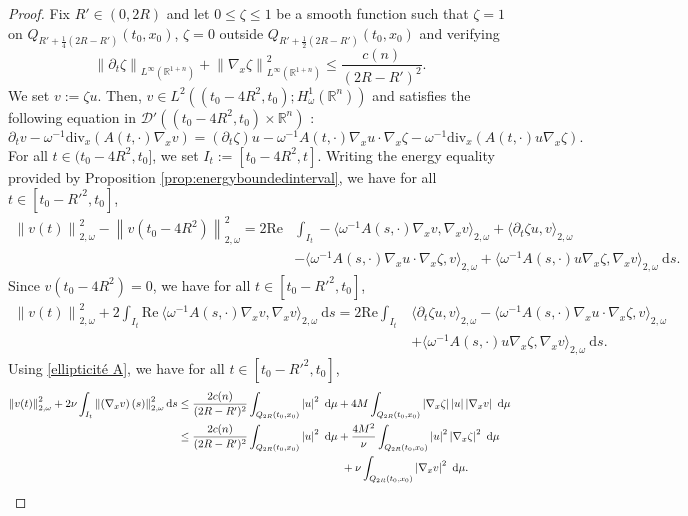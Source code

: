 \documentclass[12pt, letterpaper]{amsart}
\theoremstyle{definition}
\theoremstyle{remark}
\numberwithin{equation}{section}
\begin{document}
\begin{proof}
Fix $R'\in (0,2R)$ and let $0 \leq \zeta \leq 1$ be a smooth function such that $\zeta = 1$ on $Q_{R'+\frac{1}{4}(2R-R')}(t_0,x_0)$, $\zeta = 0$ outside $Q_{R'+\frac{1}{2}(2R-R')}(t_0,x_0)$ and verifying $$\left \| \partial_t \zeta  \right \|_{L^\infty(\mathbb{R}^{1+n})}+\left \| \nabla_x \zeta  \right \|^2_{L^\infty(\mathbb{R}^{1+n})} \leq \frac{c(n)}{(2R-R')^2} .$$ 
We set $v := \zeta u $. Then, $v \in L^2((t_0-4R^2,t_0);H^1_\omega(\mathbb{R}^n))$ and satisfies the following equation in $\mathcal{D}'((t_0-4R^2,t_0)\times \mathbb{R}^n)$ :
\begin{equation*}
    \partial_t v -\omega^{-1}\mathrm{div}_x(A(t,\cdot)\nabla_x v) = (\partial_t\zeta) u - \omega^{-1}A(t,\cdot)\nabla_x u \cdot \nabla_x \zeta - \omega^{-1}\mathrm{div}_x(A(t,\cdot) u \nabla_x \zeta).
\end{equation*}
For all $t \in (t_0-4R^2,t_0]$, we set $I_t:=[t_0-4R^2,t]$. Writing the energy equality provided by Proposition \ref{prop:energyboundedinterval}, we have for all $t \in [t_0-R'^2,t_0]$, 
\begin{align*}
    \left \| v(t) \right \|^2_{2,\omega} - \left \| v(t_0-4R^2) \right \|^2_{2,\omega}= 2 \mathrm{Re} &   \int_{I_t} - \langle \omega^{-1}A(s,\cdot) \nabla_x v, \nabla_x v\rangle_{2,\omega}+\langle \partial_t \zeta u , v\rangle_{2,\omega} \\&- \langle \omega^{-1}A(s,\cdot)\nabla_x u \cdot \nabla_x \zeta, v\rangle_{2,\omega}+\langle \omega^{-1}A(s,\cdot)u \nabla_x \zeta, \nabla_x v\rangle_{2,\omega} \  \mathrm d s.
\end{align*}
Since $v(t_0-4R^2)=0$, we have for all $t \in [t_0-R'^2,t_0]$, 
\begin{align*}
    \left \| v(t) \right \|^2_{2,\omega}+ 2\int_{I_t} \mathrm{Re} \ \langle \omega^{-1}A(s,\cdot) \nabla_x v, \nabla_x v\rangle_{2,\omega} \ \mathrm d s = 2\mathrm{Re}  \int_{I_t}   &\langle \partial_t \zeta u , v\rangle_{2,\omega} - \langle \omega^{-1}A(s,\cdot)\nabla_x u \cdot \nabla_x \zeta, v\rangle_{2,\omega} \\& +  \langle \omega^{-1}A(s,\cdot)u \nabla_x \zeta, \nabla_x v\rangle_{2,\omega} \  \mathrm d s.
\end{align*}
Using \eqref{ellipticité A}, we have for all $t \in [t_0-R'^2,t_0]$,
\begin{align*}
    \left \| v(t) \right \|^2_{2,\omega}+ 2 \nu \int_{I_t} \left \| \left ( \nabla_x v \right )(s) \right \|_{2,\omega}^2 \mathrm ds  &\leq \frac{2c(n)}{(2R-R')^2} \int_{Q_{2R}(t_0,x_0)} \left |  u \right |^2 \ \mathrm d\mu + 4M \int_{Q_{2R}(t_0,x_0)} \left |  \nabla_x \zeta \right | \left |   u \right |  \left |  \nabla_x v \right | \ \mathrm d\mu\\&\leq \frac{2c(n)}{(2R-R')^2} \int_{Q_{2R}(t_0,x_0)} \left |  u \right |^2 \ \mathrm d\mu + \frac{4M^2}{\nu} \int_{Q_{2R}(t_0,x_0)} \left |  u \right |^2 \left |  \nabla_x \zeta \right |^2 \ \mathrm d\mu \\& \hspace{5.2cm}+ \nu \int_{Q_{2R}(t_0,x_0)} \left |  \nabla_x v \right |^2 \ \mathrm d\mu.

\end{align*}
\end{proof}
\end{document}

